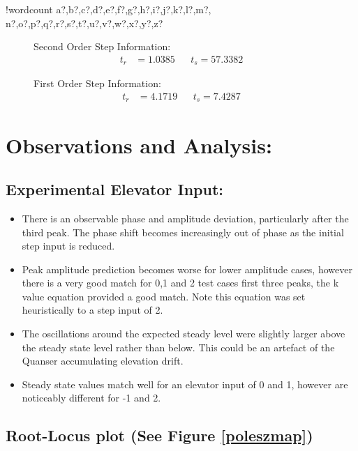 \documentclass[11pt]{article}
\providecommand{\tightlist}{%
  \setlength{\itemsep}{0pt}\setlength{\parskip}{0pt}}
\newcounter{words}
\newenvironment{counted}{%
  \setcounter{words}{0}
  \SearchList!{wordcount}{\stepcounter{words}}
    {a?,b?,c?,d?,e?,f?,g?,h?,i?,j?,k?,l?,m?,
    n?,o?,p?,q?,r?,s?,t?,u?,v?,w?,x?,y?,z?}
  \UndoBoundary{'}
  \SearchOrder{p;}}{%
  \StopSearching}
\begin{document}
\begin{counted}
\begin{figure}[H]
\centering
\begin{minipage}{.49\textwidth}
Second Order Step Information:
\begin{align*}
t_r &= 1.0385 &&t_s = 57.3382
\end{align*}
\end{minipage}
\hfill
\begin{minipage}{.49\textwidth}
First Order Step Information:
\begin{align*}
t_r &= 4.1719 &&t_s = 7.4287
\end{align*}
\end{minipage}
\vspace{-11pt}
\end{figure}

\section{Observations and Analysis:}\label{observations-and-analysis}

\subsection{Experimental Elevator
Input:}\label{experimental-elevator-input}

\begin{itemize}
\tightlist
\item
  There is an observable phase and amplitude deviation, particularly
  after the third peak. The phase shift becomes increasingly out of
  phase as the initial step input is reduced.
\item
  Peak amplitude prediction becomes worse for lower amplitude cases,
  however there is a very good match for 0,1 and 2 test cases first
  three peaks, the k value equation provided a good match. Note this
  equation was set heuristically to a step input of 2.
\item
  The oscillations around the expected steady level were slightly larger
  above the steady state level rather than below. This could be an
  artefact of the Quanser accumulating elevation drift.
\item
  Steady state values match well for an elevator input of 0 and 1,
  however are noticeably different for -1 and 2.
\end{itemize}

\subsection{\texorpdfstring{Root-Locus plot (See Figure
\ref{poleszmap})}{Root-Locus plot (See Figure )}}\label{root-locus-plot-see-figure}


\end{counted}
\end{document}
